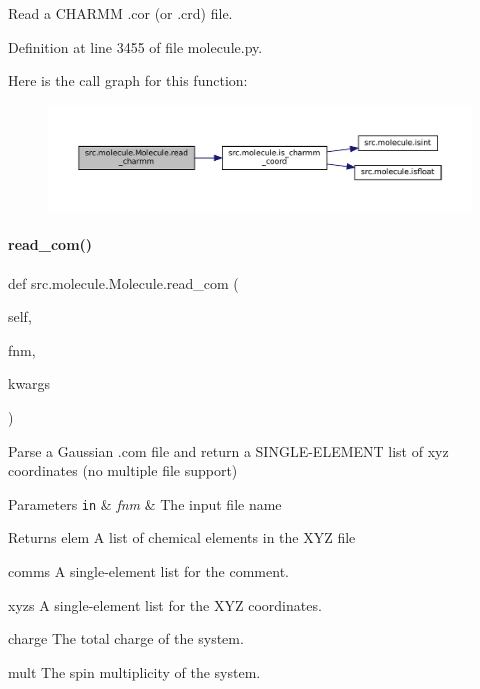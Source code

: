 Read a C\+H\+A\+R\+MM .cor (or .crd) file. 



Definition at line 3455 of file molecule.\+py.

Here is the call graph for this function\+:
\nopagebreak
\begin{figure}[H]
\begin{center}
\leavevmode
\includegraphics[width=350pt]{classsrc_1_1molecule_1_1Molecule_a3710f2055a57158a9b5fbab2c5943683_cgraph}
\end{center}
\end{figure}
\mbox{\label{classsrc_1_1molecule_1_1Molecule_a742c96f62c86d00ac97bb5004f8ebd92}} 
\paragraph{\texorpdfstring{read\+\_\+com()}{read\_com()}}
{\footnotesize\ttfamily def src.\+molecule.\+Molecule.\+read\+\_\+com (\begin{DoxyParamCaption}\item[{}]{self,  }\item[{}]{fnm,  }\item[{}]{kwargs }\end{DoxyParamCaption})}



Parse a Gaussian .com file and return a S\+I\+N\+G\+L\+E-\/\+E\+L\+E\+M\+E\+NT list of xyz coordinates (no multiple file support) 


\begin{DoxyParams}[1]{Parameters}
\mbox{\tt in}  & {\em fnm} & The input file name \\
\hline
\end{DoxyParams}
\begin{DoxyReturn}{Returns}
elem A list of chemical elements in the X\+YZ file 

comms A single-\/element list for the comment. 

xyzs A single-\/element list for the X\+YZ coordinates. 

charge The total charge of the system. 

mult The spin multiplicity of the system. 
\end{DoxyReturn}


